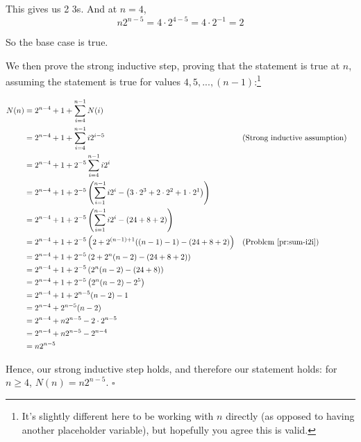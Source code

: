 This gives us 2 3s. And at $n = 4$,
\begin{equation*}
n2^{n-5} = 4 \cdot 2^{4-5} = 4 \cdot 2^{-1} = 2
\end{equation*}

So the base case is true.

We then prove the strong inductive step, proving that the statement is true at $n$, assuming the statement is true for values $4, 5, ..., (n-1)$:\footnote{It's slightly different here to be working with $n$ directly (as opposed to having another placeholder variable), but hopefully you agree this is valid.}

\begin{align*}
N(n) &= 2^{n-4} + 1 + \sum_{i=4}^{n-1} N(i) \\
&= 2^{n-4} + 1 + \sum_{i=4}^{n-1} i2^{i-5} && \text{(Strong inductive assumption)} \\
&= 2^{n-4} + 1 + 2^{-5} \sum_{i=4}^{n-1} i2^{i} \\
&= 2^{n-4} + 1 + 2^{-5} \left(\sum_{i=1}^{n-1} i2^{i} - \left( 3 \cdot 2^3 + 2 \cdot 2^2 + 1 \cdot 2^1 \right) \right) \\
&= 2^{n-4} + 1 + 2^{-5} \left(\sum_{i=1}^{n-1} i2^{i} - (24 + 8 + 2) \right) \\
&= 2^{n-4} + 1 + 2^{-5} \left(2 + 2^{(n-1)+1}((n-1)-1) - (24 + 8 + 2) \right) && \text{(Problem \ref{pr:sum-i2i})} \\
&= 2^{n-4} + 1 + 2^{-5} \left(2 + 2^{n}(n-2) - (24 + 8 + 2) \right) \\
&= 2^{n-4} + 1 + 2^{-5} \left(2^{n}(n-2) - (24 + 8) \right) \\
&= 2^{n-4} + 1 + 2^{-5} \left(2^{n}(n-2) - 2^5 \right) \\
&= 2^{n-4} + 1 + 2^{n-5}(n-2) - 1 \\
&= 2^{n-4} + 2^{n-5}(n-2) \\
&= 2^{n-4} + n2^{n-5} - 2 \cdot 2^{n-5} \\
&= 2^{n-4} + n2^{n-5} - 2^{n-4} \\
&= n2^{n-5}
\end{align*}

Hence, our strong inductive step holds, and therefore our statement holds: for $n \geq 4$, $N(n) = n2^{n-5}$. $\square$


